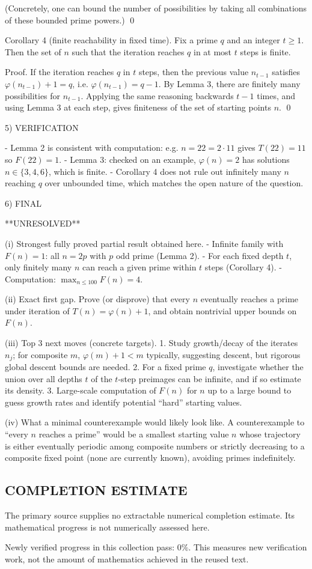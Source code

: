 (Concretely, one can bound the number of possibilities by taking all combinations of these bounded prime powers.) \qed

Corollary 4 (finite reachability in fixed time).
Fix a prime $q$ and an integer $t\ge 1$. Then the set of $n$ such that the iteration reaches $q$ in at most $t$ steps is finite.

Proof.
If the iteration reaches $q$ in $t$ steps, then the previous value $n_{t-1}$ satisfies $\varphi(n_{t-1})+1=q$, i.e. $\varphi(n_{t-1})=q-1$.
By Lemma 3, there are finitely many possibilities for $n_{t-1}$.
Applying the same reasoning backwards $t-1$ times, and using Lemma 3 at each step, gives finiteness of the set of starting points $n$. \qed

5) VERIFICATION

- Lemma 2 is consistent with computation: e.g. $n=22=2\cdot 11$ gives $T(22)=11$ so $F(22)=1$.
- Lemma 3: checked on an example, $\varphi(n)=2$ has solutions $n\in\{3,4,6\}$, which is finite.
- Corollary 4 does not rule out infinitely many $n$ reaching $q$ over unbounded time, which matches the open nature of the question.

6) FINAL

**UNRESOLVED**

(i) Strongest fully proved partial result obtained here.
- Infinite family with $F(n)=1$: all $n=2p$ with $p$ odd prime (Lemma 2).
- For each fixed depth $t$, only finitely many $n$ can reach a given prime within $t$ steps (Corollary 4).
- Computation: $\max_{n\le 100} F(n)=4$.

(ii) Exact first gap.
Prove (or disprove) that every $n$ eventually reaches a prime under iteration of $T(n)=\varphi(n)+1$, and obtain nontrivial upper bounds on $F(n)$.

(iii) Top 3 next moves (concrete targets).
1. Study growth/decay of the iterates $n_j$; for composite $m$, $\varphi(m)+1<m$ typically, suggesting descent, but rigorous global descent bounds are needed.
2. For a fixed prime $q$, investigate whether the union over all depths $t$ of the $t$-step preimages can be infinite, and if so estimate its density.
3. Large-scale computation of $F(n)$ for $n$ up to a large bound to guess growth rates and identify potential “hard” starting values.

(iv) What a minimal counterexample would likely look like.
A counterexample to “every $n$ reaches a prime” would be a smallest starting value $n$ whose trajectory is either eventually periodic among composite numbers or strictly decreasing to a composite fixed point (none are currently known), avoiding primes indefinitely.




\subsection*{COMPLETION ESTIMATE}
The primary source supplies no extractable numerical completion estimate. Its mathematical progress is not numerically assessed here.

Newly verified progress in this collection pass: $0\%$. This measures new verification work, not the amount of mathematics achieved in the reused text.
